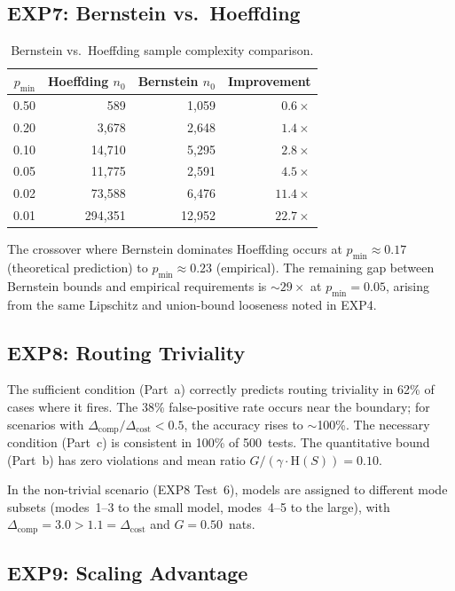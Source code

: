 \documentclass[twoside,11pt]{article}
\newcommand{\pmin}{p_{\min}}
\newcommand{\Hent}{\mathrm{H}}
\begin{document}
\subsection{EXP7: Bernstein vs.\ Hoeffding}

\begin{table}[h]
\centering
\caption{Bernstein vs.\ Hoeffding sample complexity comparison.}
\label{tab:bernstein}
\begin{tabular}{rrrr}
\toprule
$\pmin$ & Hoeffding $n_0$ & Bernstein $n_0$ & Improvement \\
\midrule
0.50 & 589 & 1{,}059 & $0.6\times$ \\
0.20 & 3{,}678 & 2{,}648 & $1.4\times$ \\
0.10 & 14{,}710 & 5{,}295 & $2.8\times$ \\
0.05 & 11{,}775 & 2{,}591 & $4.5\times$ \\
0.02 & 73{,}588 & 6{,}476 & $11.4\times$ \\
0.01 & 294{,}351 & 12{,}952 & $22.7\times$ \\
\bottomrule
\end{tabular}
\end{table}

The crossover where Bernstein dominates Hoeffding occurs at $\pmin \approx 0.17$ (theoretical prediction) to $\pmin \approx 0.23$ (empirical).
The remaining gap between Bernstein bounds and empirical requirements is $\sim 29\times$ at $\pmin = 0.05$, arising from the same Lipschitz and union-bound looseness noted in EXP4.

\subsection{EXP8: Routing Triviality}

The sufficient condition (Part~a) correctly predicts routing triviality in 62\% of cases where it fires.
The 38\% false-positive rate occurs near the boundary; for scenarios with $\Delta_{\mathrm{comp}}/\Delta_{\mathrm{cost}} < 0.5$, the accuracy rises to $\sim$100\%.
The necessary condition (Part~c) is consistent in 100\% of 500~tests.
The quantitative bound (Part~b) has zero violations and mean ratio $G/(\gamma \cdot \Hent(S)) = 0.10$.

In the non-trivial scenario (EXP8 Test~6), models are assigned to different mode subsets (modes~1--3 to the small model, modes~4--5 to the large), with $\Delta_{\mathrm{comp}} = 3.0 > 1.1 = \Delta_{\mathrm{cost}}$ and $G = 0.50$~nats.

\subsection{EXP9: Scaling Advantage}
\end{document}
